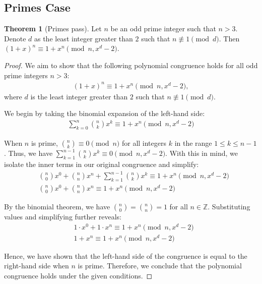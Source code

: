 \documentclass{article}
\theoremstyle{plain}
\theoremstyle{definition}
\newtheorem{theorem}{Theorem}
\begin{document}
\subsection{Primes Case}
\begin{theorem}[Primes pass] \label{theorem:primes}
Let $n$ be an odd prime integer such that $n > 3$. Denote $d$ as the least integer greater than $2$ such that $n \not\equiv 1 \pmod{d}$. Then $(1 + x)^n \equiv 1 + x^n \pmod{n, x^d - 2}$.
\end{theorem}
\begin{proof}
We aim to show that the following polynomial congruence holds for all odd prime integers $n > 3$:
\begin{align}
    (1 + x)^n \equiv 1 + x^n \pmod{n, x^d - 2},
\end{align}
where $d$ is the least integer greater than $2$ such that $n \not\equiv 1 \pmod{d}$.

We begin by taking the binomial expansion of the left-hand side:
\begin{align}
    \sum_{k=0}^{n} \binom{n}{k} x^k \equiv 1 + x^n \pmod{n, x^d - 2}
\end{align}

When $n$ is prime, $\binom{n}{k} \equiv 0 \pmod{n}$ for all integers $k$ in the range $1 \leq k \leq n-1$. Thus, we have $\sum_{k=1}^{n-1} \binom{n}{k} x^k \equiv 0 \pmod{n, x^d - 2}$. With this in mind, we isolate the inner terms in our original congruence and simplify:
\begin{align}
    & \binom{n}{0} x^0 + \binom{n}{n} x^n + \sum_{k=1}^{n-1} \binom{n}{k} x^k \equiv 1 + x^n \pmod{n, x^d - 2} \\
    & \binom{n}{0} x^0 + \binom{n}{n} x^n \equiv 1 + x^n \pmod{n, x^d - 2}
\end{align}

By the binomial theorem, we have $\binom{n}{0} = \binom{n}{n} = 1$ for all $n \in \mathbb{Z}$. Substituting values and simplifying further reveals:
\begin{align}
    & 1 \cdot x^0 + 1 \cdot x^n \equiv 1 + x^n \pmod{n, x^d - 2} \\
    & 1 + x^n \equiv 1 + x^n \pmod{n, x^d - 2}
\end{align}

Hence, we have shown that the left-hand side of the congruence is equal to the right-hand side when $n$ is prime. Therefore, we conclude that the polynomial congruence holds under the given conditions.
\end{proof}
\end{document}
